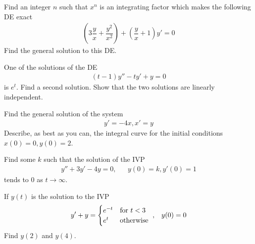 \documentclass[11pt]{exam}
\begin{document}
	\begin{questions}



		\addpoints
		\question[25] Find an integer $ n $ such that $ x ^ n $ is an integrating factor which makes the following DE exact
		\begin{align*}
			\left( 3 \dfrac {y}{ x} + \dfrac {y^2} {x^2}\right ) + \left(\dfrac{y}{x} + 1\right) y' = 0
		\end{align*}
		Find the general solution to this DE.
		\newpage







		\addpoints
		\question[25] One of the solutions of the DE
		\begin{align*}
			(t-1) y'' - t y' + y = 0
		\end{align*}
		is $ e ^ t $. Find a second solution. Show that the two solutions are linearly independent.
		\newpage







		\addpoints
		\question[25] Find the general solution of the system
		\begin{align*}
			y' = -4x, x' = y
		\end{align*}
		Describe, as best as you can, the integral curve for the initial conditions $ x(0) = 0, y(0) = 2 $.
		\newpage






		\addpoints
		\question[25] Find some $ k $ such that the solution of the IVP
		\begin{align*}
			y'' + 3y' -4y = 0 , &   & y(0) = k, y'(0) =1
		\end{align*}
		tends to $ 0 $ as $ t \rightarrow \infty$.
		\newpage








		\addpoints
		\question[25] If $ y(t) $ is the solution to the IVP
		\begin{align*}
			y' + y = \begin{cases} e ^ {-t} & \mbox{for $ t < 3 $ } \\e ^ {t} &\mbox{otherwise }\end{cases}, && y(0) = 0
		\end{align*}
		Find $ y(2) $ and $ y(4) $.
		\newpage







\end{questions}
\end{document}
